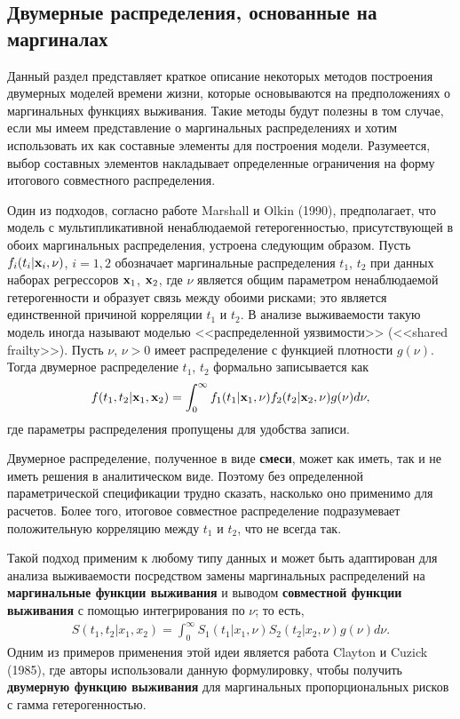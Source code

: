 \subsection{Двумерные распределения, основанные на маргиналах}\label{sec:19.3.2}

\noindent
Данный раздел представляет краткое описание некоторых методов построения двумерных моделей времени жизни, которые основываются на предположениях о маргинальных функциях выживания. Такие методы будут полезны в том случае, если мы имеем представление о маргинальных распределениях и хотим использовать их как составные элементы для построения модели. Разумеется, выбор составных элементов накладывает определенные ограничения на форму итогового совместного распределения.

Один из подходов, согласно работе Marshall и Olkin (1990), предполагает, что модель с мультипликативной ненаблюдаемой гетерогенностью, присутствующей в обоих маргинальных распределения, устроена следующим образом. Пусть $f_i(t_i|\mathbf{x}_i, \nu)$, $i = 1, 2$ обозначает маргинальные распределения $t_1$, $t_2$ при данных наборах регрессоров $\mathbf{x}_1$, $\mathbf{x}_2$, где $\nu$ является общим параметром ненаблюдаемой гетерогенности и образует связь между обоими рисками; это является единственной причиной корреляции $t_1$ и $t_2$. В анализе выживаемости такую модель иногда называют моделью <<распределенной уязвимости>> (<<shared frailty>>). Пусть $\nu$, $\nu > 0$ имеет распределение с функцией плотности $g(\nu)$. Тогда двумерное распределение $t_1$, $t_2$ формально записывается как
    \begin{align}\label{eq:19.17}
    f(t_1,t_2|\mathbf{x}_1,\mathbf{x}_2) = \int^{\infty}_{0} f_1(t_1|\mathbf{x}_1,\nu) f_2(t_2|\mathbf{x}_2,\nu) g(\nu) d\nu,
    \end{align}
где параметры распределения пропущены для удобства записи.

Двумерное распределение, полученное в виде \textbf{смеси}, может как иметь, так и не иметь решения в аналитическом виде. Поэтому без определенной параметрической спецификации трудно сказать, насколько оно применимо для расчетов. Более того, итоговое совместное распределение подразумевает положительную корреляцию между $t_1$ и $t_2$, что не всегда так.

Такой подход применим к любому типу данных и может быть адаптирован для анализа выживаемости посредством замены маргинальных распределений на \textbf{маргинальные функции выживания} и выводом \textbf{совместной функции выживания} с помощью интегрирования по $\nu$; то есть,
    \begin{align}\label{eq:19.18}
    S(t_1, t_2|x_1,x_2) = \int^{\infty}_{0} S_1(t_1|x_1,\nu) S_2(t_2|x_2,\nu) g(\nu) d\nu.
    \end{align}
Одним из примеров применения этой идеи является работа Clayton и Cuzick (1985), где авторы использовали данную формулировку, чтобы получить \textbf{двумерную функцию выживания} для маргинальных пропорциональных рисков с гамма гетерогенностью.

